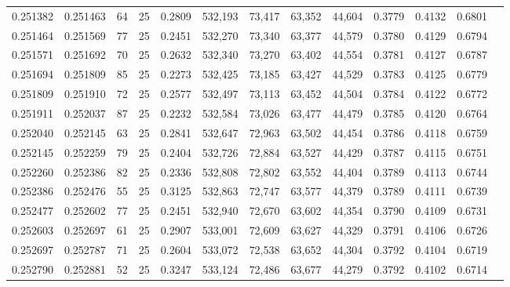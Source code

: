 \begin{tabular}{rrrrrrrrrrrrr}
0.251382 & 0.251463 &    64 &  25 &                                     0.2809 & 532,193 &  73,417 &  63,352 &  44,604 & 0.3779 & 0.4132 & 0.6801 \\
0.251464 & 0.251569 &    77 &  25 &                                     0.2451 & 532,270 &  73,340 &  63,377 &  44,579 & 0.3780 & 0.4129 & 0.6794 \\
0.251571 & 0.251692 &    70 &  25 &                                     0.2632 & 532,340 &  73,270 &  63,402 &  44,554 & 0.3781 & 0.4127 & 0.6787 \\
0.251694 & 0.251809 &    85 &  25 &                                     0.2273 & 532,425 &  73,185 &  63,427 &  44,529 & 0.3783 & 0.4125 & 0.6779 \\
0.251809 & 0.251910 &    72 &  25 &                                     0.2577 & 532,497 &  73,113 &  63,452 &  44,504 & 0.3784 & 0.4122 & 0.6772 \\
0.251911 & 0.252037 &    87 &  25 &                                     0.2232 & 532,584 &  73,026 &  63,477 &  44,479 & 0.3785 & 0.4120 & 0.6764 \\
0.252040 & 0.252145 &    63 &  25 &                                     0.2841 & 532,647 &  72,963 &  63,502 &  44,454 & 0.3786 & 0.4118 & 0.6759 \\
0.252145 & 0.252259 &    79 &  25 &                                     0.2404 & 532,726 &  72,884 &  63,527 &  44,429 & 0.3787 & 0.4115 & 0.6751 \\
0.252260 & 0.252386 &    82 &  25 &                                     0.2336 & 532,808 &  72,802 &  63,552 &  44,404 & 0.3789 & 0.4113 & 0.6744 \\
0.252386 & 0.252476 &    55 &  25 &                                     0.3125 & 532,863 &  72,747 &  63,577 &  44,379 & 0.3789 & 0.4111 & 0.6739 \\
0.252477 & 0.252602 &    77 &  25 &                                     0.2451 & 532,940 &  72,670 &  63,602 &  44,354 & 0.3790 & 0.4109 & 0.6731 \\
0.252603 & 0.252697 &    61 &  25 &                                     0.2907 & 533,001 &  72,609 &  63,627 &  44,329 & 0.3791 & 0.4106 & 0.6726 \\
0.252697 & 0.252787 &    71 &  25 &                                     0.2604 & 533,072 &  72,538 &  63,652 &  44,304 & 0.3792 & 0.4104 & 0.6719 \\
0.252790 & 0.252881 &    52 &  25 &                                     0.3247 & 533,124 &  72,486 &  63,677 &  44,279 & 0.3792 & 0.4102 & 0.6714 \\

\end{tabular}

